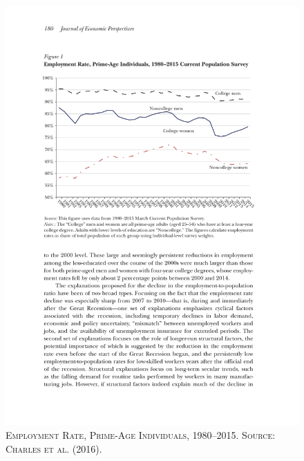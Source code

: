 \documentclass[]{book}
\begin{document}
\begin{figure}

{\centering \includegraphics[width=0.8\linewidth,height=0.8\textheight]{figures/CharlesHurstNotowidigdo2016/fig1} 

}

\caption{\textsc{Employment Rate,
Prime-Age Individuals, 1980--2015. Source: Charles et al. (2016).}}\label{fig:CharlesHurstNotowidigdo2016-fig1}
\end{figure}
\end{document}
